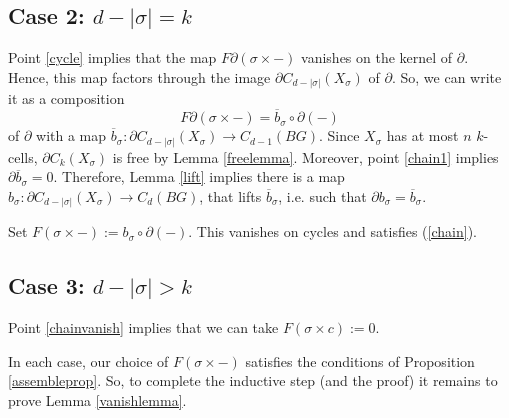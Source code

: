 \documentclass[11pt,letterpaper]{amsart}
\begin{document}
\subsection*{Case 2: $d-|\sigma|=k$} Point \ref{cycle} implies that the map $F\partial(\sigma\times -)$ vanishes on the kernel of $\partial$. Hence, this map factors through the image $\partial C_{d-|\sigma|}(X_{\sigma})$ of $\partial$. So, we can write it as a composition 
$$
F\partial(\sigma\times -)=\overline b_{\sigma}\circ\partial(-)
$$
of $\partial$ with a map $\overline b_{\sigma}:\partial C_{d-|\sigma|}(X_{\sigma})\rightarrow C_{d-1}(BG)$. Since $X_{\sigma}$ has at most $n$ $k$-cells, $\partial C_k(X_{\sigma})$ is free by Lemma \ref{freelemma}. Moreover, point \ref{chain1} implies $\partial\overline b_{\sigma}=0$. Therefore, Lemma \ref{lift} implies there is a map $b_{\sigma}:\partial C_{d-|\sigma|}(X_{\sigma})\rightarrow C_d(BG)$, that lifts $\overline b_{\sigma}$, i.e. such that $\partial b_{\sigma}=\overline b_{\sigma}$.

Set $F(\sigma\times-):=b_\sigma\circ\partial(-)$. This vanishes on cycles and satisfies (\ref{chain}).

\subsection*{Case 3: $d-|\sigma|>k$} Point \ref{chainvanish} implies that we can take $F(\sigma\times c):=0$. 

In each case, our choice of $F(\sigma\times -)$ satisfies the conditions of Proposition \ref{assembleprop}. So, to complete the inductive step (and the proof) it remains to prove Lemma \ref{vanishlemma}.
\end{document}
